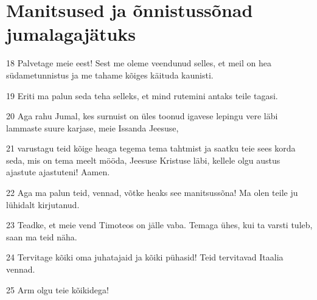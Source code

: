\section*{Manitsused ja õnnistussõnad jumalagajätuks}

\par 18 Palvetage meie eest! Sest me oleme veendunud selles, et meil on hea südametunnistus ja me tahame kõiges käituda kaunisti.
\par 19 Eriti ma palun seda teha selleks, et mind rutemini antaks teile tagasi.
\par 20 Aga rahu Jumal, kes surnuist on üles toonud igavese lepingu vere läbi lammaste suure karjase, meie Issanda Jeesuse,
\par 21 varustagu teid kõige heaga tegema tema tahtmist ja saatku teie sees korda seda, mis on tema meelt mööda, Jeesuse Kristuse läbi, kellele olgu austus ajastute ajastuteni! Aamen.
\par 22 Aga ma palun teid, vennad, võtke heaks see manitsussõna! Ma olen teile ju lühidalt kirjutanud.
\par 23 Teadke, et meie vend Timoteos on jälle vaba. Temaga ühes, kui ta varsti tuleb, saan ma teid näha.
\par 24 Tervitage kõiki oma juhatajaid ja kõiki pühasid! Teid tervitavad Itaalia vennad.
\par 25 Arm olgu teie kõikidega!






